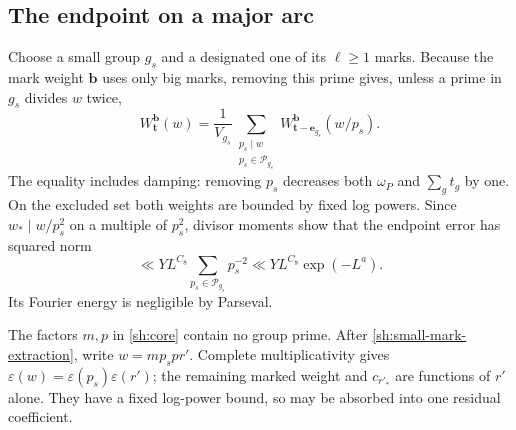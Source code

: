 \subsection{The endpoint on a major arc}

Choose a small group $g_s$ and a designated one of its
$\ell\geq1$ marks.  Because the mark weight $\mathbf b$ uses only
big marks, removing this prime gives, unless a prime in $g_s$
divides $w$ twice,
\begin{equation}\label{sh:small-mark-extraction}
 W_{\mathbf t}^{\mathbf b}(w)
 =\frac1{V_{g_s}}\sum_{\substack{p_s\mid w\\p_s\in\mathcal P_{g_s}}}
           W_{\mathbf t-\mathbf e_{g_s}}^{\mathbf b}(w/p_s).
\end{equation}
The equality includes damping: removing $p_s$ decreases both
$\omega_P$ and $\sum_g t_g$ by one.  On the excluded set both
weights are bounded by fixed log powers.  Since $w_*\mid w/p_s^2$
on a multiple of $p_s^2$, divisor moments show that the endpoint
error has squared norm
\begin{equation}\label{sh:small-square-error}
 \ll YL^{C_8}\sum_{p_s\in\mathcal P_{g_s}}p_s^{-2}
 \ll YL^{C_8}\exp(-L^a).
\end{equation}
Its Fourier energy is negligible by Parseval.

The factors $m,p$ in \eqref{sh:core} contain no group prime.
After \eqref{sh:small-mark-extraction}, write $w=mp_sp r'$.
Complete multiplicativity gives
$\varepsilon(w)=\varepsilon(p_s)\varepsilon(r')$; the remaining
marked weight and $c_{r'_*}$ are functions of $r'$ alone.  They
have a fixed log-power bound, so may be absorbed into one residual
coefficient.

